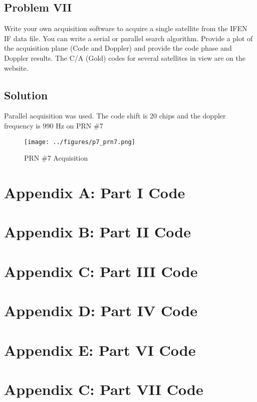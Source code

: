 \documentclass{article}
\begin{document}
\subsection*{Problem VII}
Write your own acquisition software to acquire a single satellite from the IFEN IF data file.
You can write a serial or parallel search algorithm. Provide a plot of the acquisition plane
(Code and Doppler) and provide the code phase and Doppler results. The C/A (Gold) codes
for several satellites in view are on the website.
\subsection*{Solution}
Parallel acquisition was used.  The code shift is 20 chips and the doppler frequency is 990 Hz on PRN \#7
\begin{figure}[H]
    \centering
    \texttt{[image: ../figures/p7\_prn7.png]}\label{fig:p7_prn7}
    \caption{PRN \#7 Acquisition}
\end{figure}

\section*{Appendix A: Part I Code}


\section*{Appendix B: Part II Code}


\section*{Appendix C: Part III Code}


\section*{Appendix D: Part IV Code}


\section*{Appendix E: Part VI Code}


\section*{Appendix C: Part VII Code}

\end{document}
